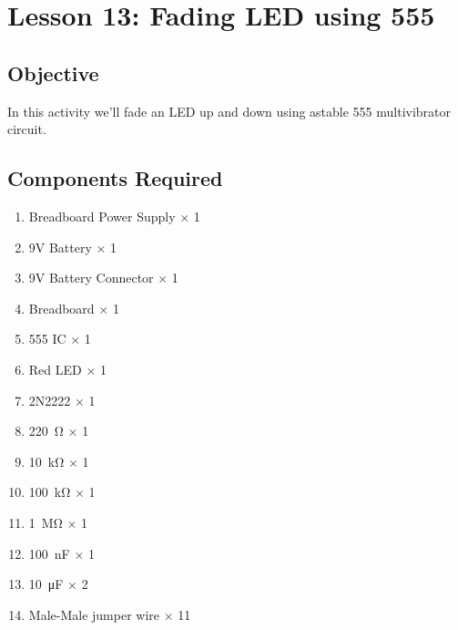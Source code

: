 \section{Lesson 13: Fading LED using 555}
\subsection{Objective}
In this activity we'll fade an LED up and down using astable 555 multivibrator circuit.
\subsection{Components Required}
\begin{enumerate}
    \item Breadboard Power Supply $\times$ 1
    \item 9V Battery $\times$ 1
    \item 9V Battery Connector $\times$ 1
    \item Breadboard $\times$ 1
    \item 555 IC $\times$ 1
    \item Red LED $\times$ 1
    \item 2N2222 $\times$ 1
    \item \SI{220}{\ohm} $\times$ 1
    \item \SI{10}{\kilo\ohm} $\times$ 1
    \item \SI{100}{\kilo\ohm} $\times$ 1
    \item \SI{1}{\Mohm} $\times$ 1
    \item \SI{100}{\nano\farad} $\times$ 1
    \item \SI{10}{\micro\farad} $\times$ 2
    \item Male-Male jumper wire $\times$ 11
\end{enumerate}
